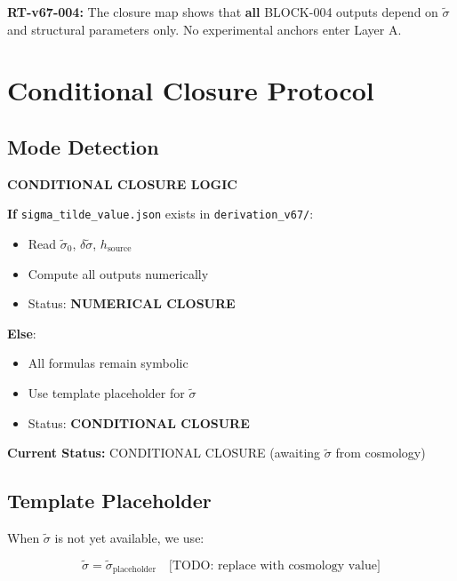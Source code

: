 \documentclass[11pt,letterpaper]{article}
\newcommand{\st}{\tilde{\sigma}}
\begin{document}
\begin{reviewertrap}
\textbf{RT-v67-004:} The closure map shows that \textbf{all} BLOCK-004 outputs depend on $\st$ and structural parameters only. No experimental anchors enter Layer A.
\end{reviewertrap}

\section{Conditional Closure Protocol}
\label{sec:conditional-closure}

\subsection{Mode Detection}
\label{subsec:mode-detection}

\begin{templatebox}
\textbf{CONDITIONAL CLOSURE LOGIC}

\textbf{If} \texttt{sigma\_tilde\_value.json} exists in \texttt{derivation\_v67/}:
\begin{itemize}[noitemsep]
\item Read $\st_0$, $\delta\st$, $h_{\text{source}}$
\item Compute all outputs numerically
\item Status: \textbf{NUMERICAL CLOSURE}
\end{itemize}

\textbf{Else}:
\begin{itemize}[noitemsep]
\item All formulas remain symbolic
\item Use template placeholder for $\st$
\item Status: \textbf{CONDITIONAL CLOSURE}
\end{itemize}

\textbf{Current Status:} CONDITIONAL CLOSURE (awaiting $\st$ from cosmology)
\end{templatebox}

\subsection{Template Placeholder}
\label{subsec:template-placeholder}

When $\st$ is not yet available, we use:

\begin{equation}
\st = \st_{\text{placeholder}} \quad \text{[TODO: replace with cosmology value]}
\label{eq:sigma-placeholder}
\end{equation}
\end{document}
